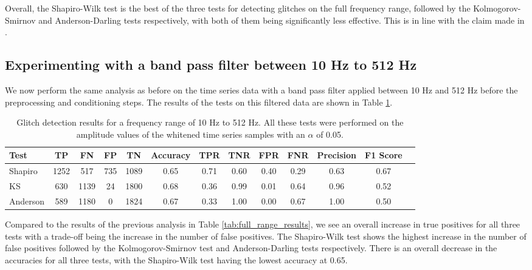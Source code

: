 \documentclass[12pt]{article}
\begin{document}
\medskip
\noindent Overall, the Shapiro-Wilk test is the best of the three tests for detecting glitches on the full frequency range, followed by the Kolmogorov-Smirnov and Anderson-Darling tests respectively, with both of them being significantly less effective. This is in line with the claim made in \cite{razali2011power}.

\pagebreak

\subsection{Experimenting with a band pass filter between 10 Hz to 512 Hz}\label{Experiment_2}

We now perform the same analysis as before on the time series data with a band pass filter applied between 10 Hz and 512 Hz before the preprocessing and conditioning steps. The results of the tests on this filtered data are shown in Table \ref{tab:low_frequency_results}.

\begin{table}[H]
  \centering
  \begin{tabular}{lcccccccccccc}
  \toprule
  Test & TP & FN & FP & TN & Accuracy & TPR & TNR & FPR & FNR & Precision & F1 Score \\
  \midrule
  Shapiro & 1252 & 517 & 735 & 1089 & 0.65 & 0.71 & 0.60 & 0.40 & 0.29 & 0.63 & 0.67 \\
  KS & 630 & 1139 & 24 & 1800 & 0.68 & 0.36 & 0.99 & 0.01 & 0.64 & 0.96 & 0.52 \\
  Anderson & 589 & 1180 & 0 & 1824 & 0.67 & 0.33 & 1.00 & 0.00 & 0.67 & 1.00 & 0.50 \\
  \bottomrule
  \end{tabular}
  \caption{Glitch detection results for a frequency range of 10 Hz to 512 Hz. All these tests were performed on the amplitude values of the whitened time series samples with an $\alpha$ of 0.05.}
  \label{tab:low_frequency_results}
\end{table}

\noindent Compared to the results of the previous analysis in Table \ref{tab:full_range_results}, we see an overall increase in true positives for all three tests with a trade-off being the increase in the number of false positives. The Shapiro-Wilk test shows the highest increase in the number of false positives followed by the Kolmogorov-Smirnov test and Anderson-Darling tests respectively. There is an overall decrease in the accuracies for all three tests, with the Shapiro-Wilk test having the lowest accuracy at 0.65.
\end{document}

